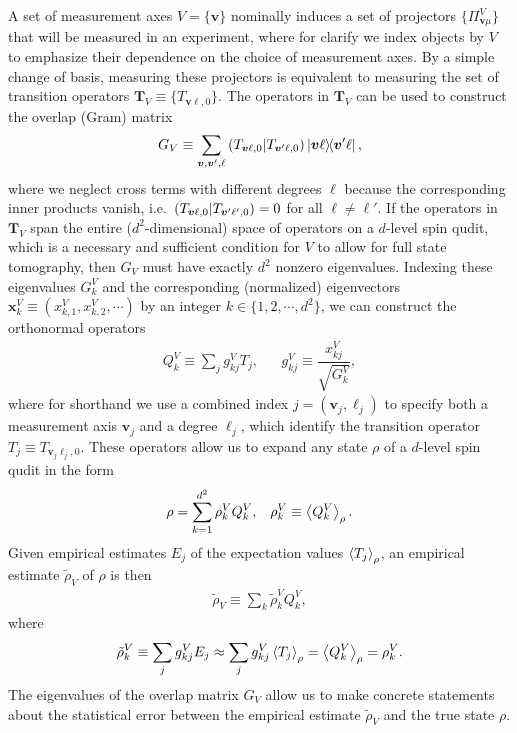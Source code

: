 \documentclass[notitlepage,twocolumn]{revtex4-2}
\newcommand{\f}[2]{\dfrac{#1}{#2}} %
\newcommand{\p}[1]{\left(#1\right)} %
\renewcommand{\set}[1]{\{#1\}} %
\newcommand{\bk}{\Braket} %
\renewcommand{\v}{\bm} %
\newcommand{\1}{\mathds{1}}
\def\obk#1{\mathinner{({#1})}}
\begin{document}
A set of measurement axes $V=\set{\v v}$ nominally induces a set of projectors $\set{\Pi_{\v v\mu}^V}$ that will be measured in an experiment, where for clarify we index objects by $V$ to emphasize their dependence on the choice of measurement axes.
By a simple change of basis, measuring these projectors is equivalent to measuring the set of transition operators $\v T_V\equiv\set{T_{\v v\ell,0}}$.
The operators in $\v T_V$ can be used to construct the overlap (Gram) matrix
\begin{align}
  G_V \equiv \sum_{\v v,\v v',\ell}
  \obk{T_{\v v\ell,0}|T_{\v v'\ell,0}} \op{\v v\ell}{\v v'\ell},
  \label{eq:overlap_matrix}
\end{align}
where we neglect cross terms with different degrees $\ell$ because the corresponding inner products vanish, i.e.~$\obk{T_{\v v\ell,0}|T_{\v v'\ell',0}}=0$ for all $\ell\ne\ell'$.
If the operators in $\v T_V$ span the entire ($d^2$-dimensional) space of operators on a $d$-level spin qudit, which is a necessary and sufficient condition for $V$ to allow for full state tomography, then $G_V$ must have exactly $d^2$ nonzero eigenvalues.
Indexing these eigenvalues $G^V_k$ and the corresponding (normalized) eigenvectors $\v x^V_k\equiv(x^V_{k,1},x^V_{k,2},\cdots)$ by an integer $k\in\set{1,2,\cdots,d^2}$, we can construct the orthonormal operators
\begin{align}
  Q^V_k \equiv \sum_j g^V_{kj} T_j,
  &&
  g^V_{kj} \equiv \f{x^V_{kj}}{\sqrt{G^V_k}},
\end{align}
where for shorthand we use a combined index $j=\p{\v v_j,\ell_j}$ to specify both a measurement axis $\v v_j$ and a degree $\ell_j$, which identify the transition operator $T_j\equiv T_{\v v_j\ell_j,0}$.
These operators allow us to expand any state $\rho$ of a $d$-level spin qudit in the form
\begin{align}
  \rho = \sum_{k=1}^{d^2} \rho_k^V Q_k^V,
  &&
  \rho_k^V \equiv \bk{Q^V_k}_\rho.
\end{align}
Given empirical estimates $E_j$ of the expectation values $\bk{T_j}_\rho$, an empirical estimate $\tilde\rho_V$ of $\rho$ is then
\begin{align}
  \tilde\rho_V \equiv \sum_k \tilde\rho^V_k Q^V_k,
  \label{eq:reconstructed_state}
\end{align}
where
\begin{align}
  \tilde\rho^V_k \equiv \sum_j g^V_{kj} E_j
  \approx \sum_j g^V_{kj} \bk{T_j}_\rho
  = \bk{Q^V_k}_\rho
  = \rho^V_k.
\end{align}
The eigenvalues of the overlap matrix $G_V$ allow us to make concrete statements about the statistical error between the empirical estimate $\tilde\rho_V$ and the true state $\rho$.
\end{document}
